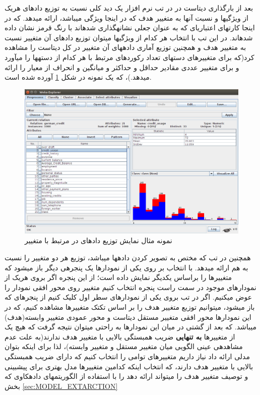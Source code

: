 \documentclass[journal]{IEEEtran}
\newcommand{\نیمفاصله}{\halfspace}
\renewcommand{\ }{\halfspace}
\newcommand{\وکا}{\lr{WEKA} }
\newcommand{\ار}{\lr{R} }
\renewcommand{\|}[1][.3em]{\hspace{#1}|\hspace{#1}}
\renewcommand{\,}[1][.3em]{,\hspace{#1}}
\begin{document}
بعد از بارگذاری دیتاست در \وکا در تب
نرم افزار یک دید کلی نسبت به توزیع داده\ ای هریک از ویژگی\ ها و نسبت آنها به متغییر هدف که در اینجا ویژگی
می\ باشد، ارائه می\ دهد. که در اینجا کارت\ های اعتباری\ ای که به عنوان جعلی نشانه\ گذاری شده\ اند با رنگ قرمز نشان داده شده\ اند. در این تب با انتخاب هر کدام از ویژگی\ ها می\ توان توزیع داده\ ای آن متغییر نسبت به متغییر هدف و همچنین توزیع آماری داده\ های آن متغییر در کل دیتاست را مشاهده کرد(که برای متغییرهای دسته\ ای تعداد رکوردهای مرتبط با هر کدام از دسته\ ها را می\ آورد و برای متغییر عددی مقادیر حداقل و حداکثر و میانگین و انحراف از معیار را ارائه می\ دهد.)، که یک نمونه در شکل
\ref{fig:EDA:weka-preprocess-dist}
آورده شده است.
\begin{figure}
\centering
\includegraphics[width=.5\textwidth]{weka-preprocess-dist}
\caption{نمونه مثال نمایش توزیع داده\ ای در \وکا مرتبط با متغییر }\label{fig:EDA:weka-preprocess-dist}
\end{figure}
همچنین در تب
که مختص به تصویر کردن داده\ ها می\ باشد، توزیع هر دو متغییر را نسبت به هم ارائه می\ دهد. با انتخاب بر روی یکی از نمودارها یک پنجره\ ی دیگر باز می\ شود که متغییرها را براساس یک\ دیگر نمایش داده است؛ از این پنجره اگر بروی هریک از نمودارهای موجود در سمت راست پنجره انتخاب کنیم متغییر روی محور افقی نمودار را عوض میکنیم. اگر در تب
بروی یکی از نمودارهای سطر اول کلیک کنیم از پنجره\ ای که باز می\ شود، می\ توانیم توزیع متغییر هدف را بر اساس تک\ تک متغییر\ ها مشاهده کنیم، که در این نمودارها محور افقی متغییر مستقل دیتاست و محور عمودی متغییر وابسته(هدف) می\ باشد. که بعد از گشتی در میان این نمودارها به راحتی می\ توان نتیجه گرفت که هیچ یک از متغییرها \textbf{به تنهایی} ضریب همبستگی بالایی با متغییر هدف ندارند(به علت عدم مشاهده\ ی عینی الگویی میان متغییر مستقل و متغییر وابسته)، لذا برای اینکه بتوان مدلی ارائه داد نیاز داریم متغییرهای توامی را انتخاب کنیم که دارای ضریب همبستگی بالایی با متغییر هدف دارند، که انتخاب اینکه کدامین متغییرها مدل بهتری برای پیشبینی و توصیف متغییر هدف را می\ تواند ارائه دهد را با استفاده از الگوریتم\ های داده\ کاوی که بخش
\ref{sec:MODEL_EXTARCTION}
\end{document}
